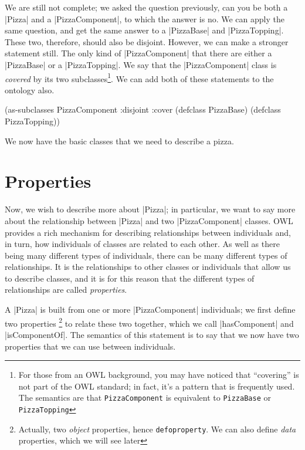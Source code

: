 We are still not complete; we asked the question previously, can you
be both a |Pizza| and a |PizzaComponent|, to which the answer is
no. We can apply the same question, and get the same answer to a
|PizzaBase| and |PizzaTopping|.  These two, therefore, should also be
disjoint. However, we can make a stronger statement still. The only
kind of |PizzaComponent| that there are either a |PizzaBase| or a
|PizzaTopping|. We say that the |PizzaComponent| class is
\emph{covered} by its two subclasses\footnote{For those from an OWL
  background, you may have noticed that ``covering'' is not part of
  the OWL standard; in fact, it's a pattern that is frequently
  used. The semantics are that \lstinline{PizzaComponent} is
  equivalent to \lstinline{PizzaBase} or \lstinline{PizzaTopping}}. We
can add both of these statements to the ontology also.

\begin{tawny}
(as-subclasses
 PizzaComponent
 :disjoint :cover
 (defclass PizzaBase)
 (defclass PizzaTopping))
\end{tawny}

We now have the basic classes that we need to describe a pizza.

\section{Properties}
\label{sec:properties}

Now, we wish to describe more about |Pizza|; in particular, we want to say
more about the relationship between |Pizza| and two |PizzaComponent| classes.
OWL provides a rich mechanism for describing relationships between individuals
and, in turn, how individuals of classes are related to each other. As well as
there being many different types of individuals, there can be many
different types of relationships. It is the relationships to other classes or
individuals that allow us to describe classes, and it is for this reason that
the different types of relationships are called \emph{properties}.

A |Pizza| is built from one or more |PizzaComponent| individuals; we first
define two properties \footnote{Actually, two \emph{object} properties, hence
  \lstinline|defoproperty|. We can also define \emph{data} properties, which
  we will see later} to relate these two together, which we call
|hasComponent| and |isComponentOf|. The semantics of this statement is to say
that we now have two properties that we can use between individuals.

